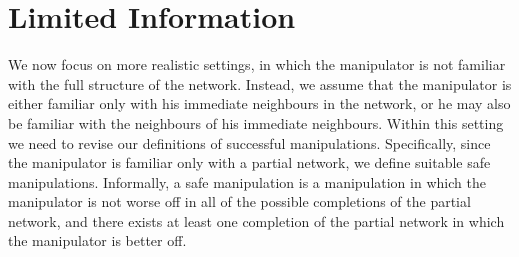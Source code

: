\documentclass{article}
\begin{document}
\section{Limited Information}
\label{sec:limited}
We now focus on more realistic settings, in which the manipulator is not familiar with the full structure of the network. Instead, we assume that the manipulator is either familiar only with his immediate neighbours in the network, or he may also be familiar with the neighbours of his immediate neighbours. Within this setting we need to revise our definitions of successful manipulations. Specifically, since the manipulator is familiar only with a partial network, we define suitable safe manipulations. Informally, a safe manipulation is a manipulation in which the manipulator is not worse off in all of the possible completions of the partial network, and there exists at least one completion of the partial network in which the manipulator is better off.  
\end{document}
